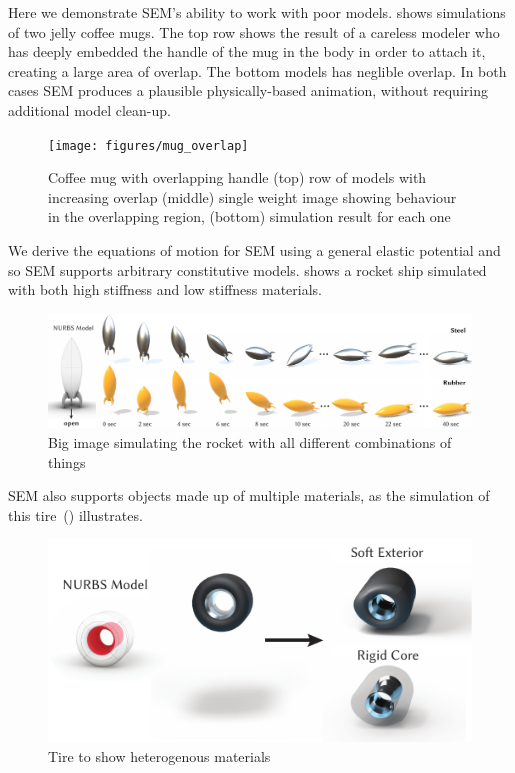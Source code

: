 Here we demonstrate SEM's ability to work with poor models.  shows simulations of two jelly coffee mugs. 
The top row shows the result of a careless modeler who has deeply embedded the handle of the mug in the body in order to attach it, creating a large area of overlap.
The bottom models has neglible overlap. 
In both cases SEM produces a plausible physically-based animation, without requiring additional model clean-up.
\begin{figure}[h]
  \texttt{[image: figures/mug\_overlap]}
  \caption{Coffee mug with overlapping handle (top) row of models with increasing overlap (middle) single weight image showing behaviour in the overlapping region, (bottom) simulation result for each one}
  \label{fig:badmodels}
\end{figure}

We derive the equations of motion for SEM using a general elastic potential and so SEM supports arbitrary constitutive models.  shows a 
rocket ship simulated with both high stiffness and low stiffness materials. 
\begin{figure}[htp]
  \includegraphics[width=\textwidth]{figures/rocket.pdf}
  \caption{Big image simulating the rocket with all different combinations of things}
  \label{fig:rocket}
\end{figure}

SEM also supports objects made up of multiple materials, as the simulation of this tire~() illustrates.
\begin{figure}[h]
  \includegraphics[width=\columnwidth]{figures/tire}
  \caption{Tire to show heterogenous materials}
  \label{fig:tire}
\end{figure}


